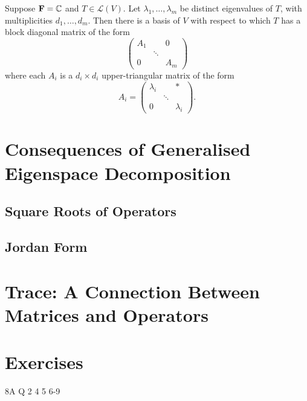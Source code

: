 \begin{proposition}
Suppose $\mathbf F=\mathbb C$ and $T\in\mathcal{L}(V)$. Let $\lambda_1,\dots,\lambda_m$ be distinct eigenvalues of $T$, with multiplicities $d_1,\dots,d_m$. Then there is a basis of $V$ with respect to which $T$ has a block diagonal matrix of the form
\[\begin{pmatrix}
A_1&&0\\
&\ddots&\\
0&&A_m
\end{pmatrix}\]
where each $A_i$ is a $d_i\times d_i$ upper-triangular matrix of the form
\[A_i=\begin{pmatrix}
\lambda_i&&\ast\\
&\ddots&\\
0&&\lambda_i
\end{pmatrix}.\]
\end{proposition}
\pagebreak

\section{Consequences of Generalised Eigenspace Decomposition}
\subsection{Square Roots of Operators}
\subsection{Jordan Form}

\section{Trace: A Connection Between Matrices and Operators}

\section*{Exercises}
8A Q 2 4 5 6-9
\begin{exercise}

\end{exercise}